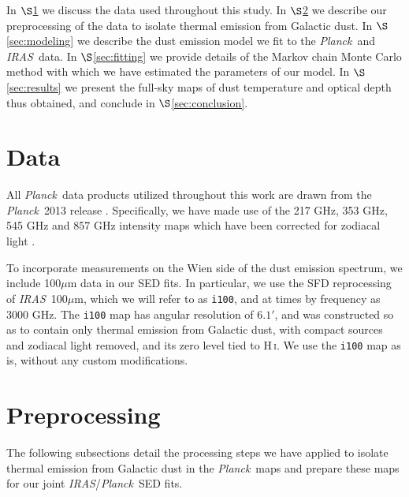 \documentclass{emulateapj}
\newcommand{\IRAS}{{\it IRAS}}
\newcommand{\PLANCK}{{\it Planck}}
\begin{document}

In $\S$\ref{sec:data} we discuss the data used throughout this study. In 
$\S$\ref{sec:prepro} we describe our preprocessing of the data to isolate 
thermal emission from Galactic dust. In $\S$\ref{sec:modeling} we describe the 
dust emission model we fit to the \PLANCK~and \IRAS~data. In 
$\S$\ref{sec:fitting} we provide details of the Markov chain Monte Carlo method
with which we have estimated the parameters of our model. In 
$\S$\ref{sec:results} we present the full-sky maps of dust temperature and 
optical depth thus obtained, and conclude in $\S$\ref{sec:conclusion}.

 \section{Data}
\label{sec:data}
All \PLANCK~data products utilized throughout this work are drawn from the 
\PLANCK~2013 release \citep{planck2013}. Specifically, we have made use 
of the 217 GHz, 353 GHz, 545 GHz and 857 GHz intensity maps which have been 
corrected for zodiacal light 
\citep[\texttt{R1.10\_nominal\_ZodiCorrected},][]{planckzodi}.

To incorporate measurements on the Wien side of the dust emission spectrum, 
we include 100$\mu$m data in our SED fits. In particular, we use the SFD 
reprocessing of \IRAS~100$\mu$m, which we will refer to as \verb|i100|, and at 
times by frequency as 3000 GHz. The \verb|i100| map has angular resolution of 
$6.1'$, and was constructed so as to contain only thermal 
emission from Galactic dust, with compact sources and zodiacal light removed, 
and its zero level tied to H\,\textsc{i}. We use the \verb|i100| map as is, without any 
custom modifications.


\section{Preprocessing}
\label{sec:prepro}

The following subsections detail the processing steps we have applied to 
isolate thermal emission from Galactic dust in the \PLANCK~maps and prepare
these maps for our joint \IRAS/\PLANCK~SED fits.
\end{document}
